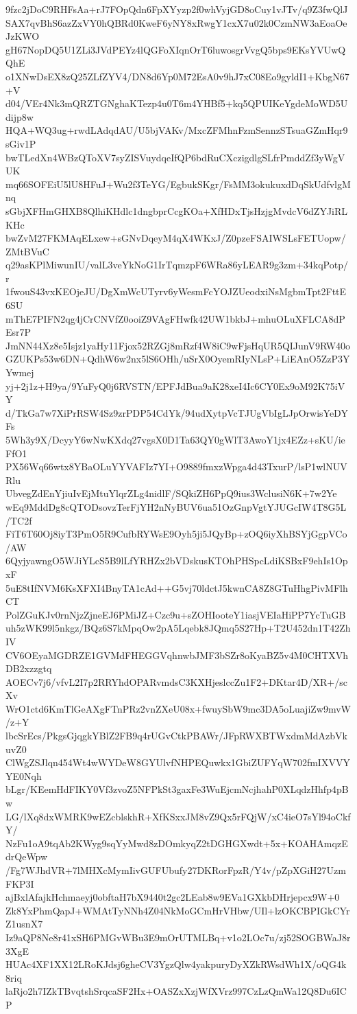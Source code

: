 9fzc2jDoC9RHFsAa+rJ7FOpQdn6FpXYyzp2f0whVyjGD8oCuy1vJTv/q9Z3fwQlJ
SAX7qvBhS6azZxVY0hQBRd0KweF6yNY8xRwgY1cxX7u02k0CzmNW3aEoaOeJzKWO
gH67NopDQ5U1ZLi3JVdPEYz4lQGFoXIqnOrT6luwosgrVvgQ5bps9EKsYVUwQQhE
o1XNwDsEX8zQ25ZLfZYV4/DN8d6Yp0M72EsA0v9hJ7xC08Eo9gyldI1+KbgN67+V
d04/VEr4Nk3mQRZTGNghaKTezp4u0T6m4YHBf5+kq5QPUIKeYgdeMoWD5Udijp8w
HQA+WQ3ug+rwdLAdqdAU/U5bjVAKv/MxcZFMhnFzmSennzSTsuaGZmHqr9sGiv1P
bwTLedXn4WBzQToXV7syZISVuydqeIfQP6bdRuCXczigdlgSLfrPmddZf3yWgVUK
mq66SOFEiU5lU8HFuJ+Wu2f3TeYG/EgbukSKgr/FsMM3okukuxdDqSkUdfvlgMnq
sGbjXFHmGHXB8QlhiKHdlc1dngbprCcgKOa+XfHDxTjsHzjgMvdcV6dZYJiRLKHc
bwZvM27FKMAqELxew+sGNvDqeyM4qX4WKxJ/Z0pzeFSAIWSLsFETUopw/ZMtBVuC
q29asKPlMiwunIU/valL3veYkNoG1IrTqmzpF6WRa86yLEAR9g3zm+34kqPotp/r
1fwouS43vxKEOjeJU/DgXmWcUTyrv6yWesmFcYOJZUeodxiNsMgbmTpt2FttE6SU
mThE7PIFN2qg4jCrCNVfZ0ooiZ9VAgFHwfk42UW1bkbJ+mhuOLuXFLCA8dPEsr7P
JmNN44Xz8e5Isjz1yaHy11Fjox52RZGj8mRzf4W8iC9wFjsHqUR5QIJunV9RW40o
GZUKPs53w6DN+QdhW6w2nx5lS6OHh/uSrX0OyemRIyNLsP+LiEAnO5ZzP3YYwmej
yj+2j1z+H9ya/9YuFyQ0j6RVSTN/EPFJdBua9aK28xeI4Ic6CY0Ex9oM92K75iVY
d/TkGa7w7XiPrRSW4Sz9zrPDP54CdYk/94udXytpVcTJUgVbIgLJpOrwisYeDYFs
5Wh3y9X/DcyyY6wNwKXdq27vgsX0D1Ta63QY0gWlT3AwoY1jx4EZz+sKU/ieFfO1
PX56Wq66wtx8YBaOLuYYVAFIz7YI+O9889fmxzWpga4d43TxurP/lsP1wlNUVRlu
UbvegZdEnYjiuIvEjMtuYlqrZLg4nidlF/SQkiZH6PpQ9ius3WclusiN6K+7w2Ye
wEq9MddDg8cQTODsovzTerFjYH2nNyBUV6ua51OzGnpVgtYJUGcIW4T8G5L/TC2f
FiT6T60Oj8iyT3PmO5R9CufbRYWsE9Oyh5ji5JQyBp+zOQ6iyXhBSYjGgpVCo/AW
6QyjyawngO5WJiYLcS5B9lLfYRHZx2bVDskusKTOhPHSpcLdiKSBxF9ehIs1OpxF
5uE8tIfNVM6KsXFXI4BnyTA1cAd++G5vj70ldctJ5kwnCA8Z8GTuHhgPivMFlhCT
PolZGuKJv0rnNjzZjneEJ6PMiJZ+Czc9u+sZOHIooteY1iasjVEIaHiPP7YcTuGB
uh5zWK99l5nkgz/BQz6S7kMpqOw2pA5Lqebk8JQmq5S27Hp+T2U452dn1T42ZhIV
CV6OEyaMGDRZE1GVMdFHEGGVqhnwbJMF3bSZr8oKyaBZ5v4M0CHTXVhDB2xzzgtq
AOECv7j6/vfvL2I7p2RRYhdOPARvmdsC3KXHjeslccZu1F2+DKtar4D/XR+/scXv
WrO1ctd6KmTlGeAXgFTnPRz2vnZXeU08x+fwuySbW9mc3DA5oLuajiZw9mvW/z+Y
lbcSrEcs/PkgsGjqgkYBlZ2FB9q4rUGvCtkPBAWr/JFpRWXBTWxdmMdAzbVkuvZ0
ClWgZSJlqn454Wt4wWYDeW8GYUlvfNHPEQuwkx1GbiZUFYqW702fmIXVVYYE0Nqh
bLgr/KEemHdFIKY0Vf3zvoZ5NFPkSt3gaxFe3WuEjcmNcjhahP0XLqdzHhfp4pBw
LG/lXq8dxWMRK9wEZcblskhR+XfKSxxJM8vZ9Qx5rFQjW/xC4ieO7sYl94oCkfY/
NzFu1oA9tqAb2KWyg9sqYyMwd8zDOmkyqZ2tDGHGXwdt+5x+KOAHAmqzEdrQeWpw
/Fg7WJhdVR+7lMHXcMymIivGUFUbufy27DKRorFpzR/Y4v/pZpXGiH27UzmFKP3I
ajBxlAfajkHchmaeyj0obftaH7bX9440t2gc2LEab8w9EVa1GXkbDHrjepcx9W+0
Zk8YxPhmQapJ+WMAtTyNNh4Z04NkMoGCmHrVHbw/UIl+lzOKCBPIGkCYrZ1usnX7
Iz9aQP8Ne8r41xSH6PMGvWBu3E9mOrUTMLBq+v1o2LOc7u/zj52SOGBWaJ8r3XgE
HUAc4XF1XX12LRoKJdsj6gheCV3YgzQlw4yakpuryDyXZkRWsdWh1X/oQG4k8riq
laRjo2h7IZkTBvqtshSrqcaSF2Hx+OASZxXzjWfXVrz997CzLzQmWa12Q8Du6ICP
